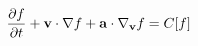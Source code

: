 \documentclass[preview]{standalone}
\begin{document}
\begin{align*}
\special{dvisvgm:raw <g id='unique000'>}\pdv{f}{t}+\va v\cdot\nabla f+\va a\cdot\nabla_{\va v}f=C[f]\special{dvisvgm:raw </g>}
\end{align*}
\end{document}
